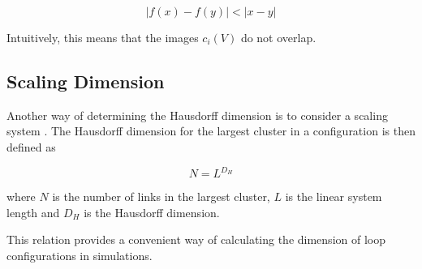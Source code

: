 \begin{equation}
    |f(x) - f(y)| < |x - y|
\end{equation}

Intuitively, this means that the images $c_i(V)$ do not overlap.

\subsection{Scaling Dimension}
\label{subsec:ScalingDimension}

Another way of determining the Hausdorff dimension is to consider a scaling system \cite{Camarda:MethodsDetermineHausdorff}. The Hausdorff dimension for the largest cluster in a configuration is then defined as

\begin{equation}
    N = L^{D_H}
\end{equation}

\noindent where $N$ is the number of links in the largest cluster, $L$ is the linear system length and $D_H$ is the Hausdorff dimension.

This relation provides a convenient way of calculating the dimension of loop configurations in simulations.


